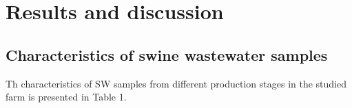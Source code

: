 \section{Results and discussion}
\subsection{Characteristics of swine wastewater samples}
Th characteristics of SW samples from different production stages in the studied farm is presented in Table 1.